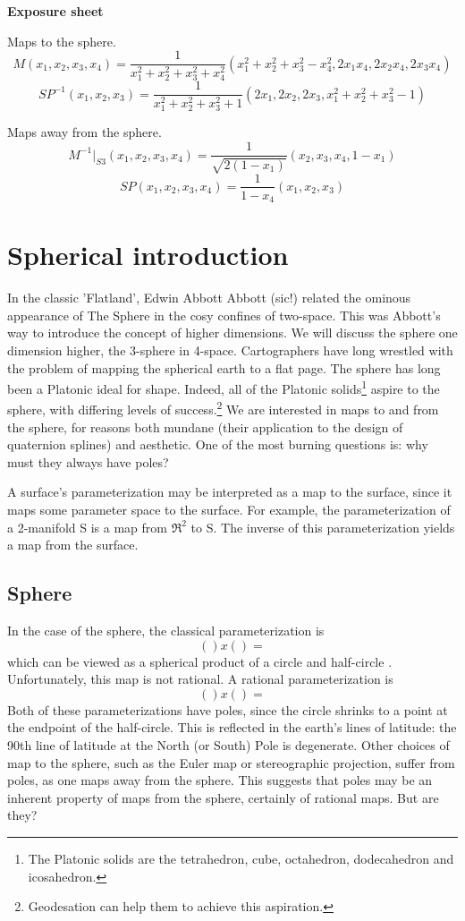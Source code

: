 \documentclass[12pt]{article}
\begin{document}
\clearpage

{\bf Exposure sheet}

Maps to the sphere.
\[
	M(x_1,x_2,x_3,x_4) =
	\frac{1}{x_1^2 + x_2^2 + x_3^2 + x_4^2}
	(x_1^2 + x_2^2 + x_3^2 - x_4^2, 2x_1x_4, 2x_2x_4, 2x_3x_4)
\]
\[
SP^{-1}(x_1,x_2,x_3) = \frac{1}{x_1^2 + x_2^2 + x_3^2 + 1} 
                       (2x_1, 2x_2, 2x_3, x_1^2+x_2^2+x_3^2 - 1)
\]

Maps away from the sphere.
\[
M^{-1}|_{S3}(x_1,x_2,x_3,x_4) = \frac{1}{\sqrt{2(1-x_1)}}(x_2,x_3,x_4,1-x_1)
\]
\[
SP(x_1,x_2,x_3,x_4) = \frac{1}{1-x_4} (x_1,x_2,x_3)
\]

\clearpage

\tableofcontents

\clearpage

\section{Spherical introduction}

In the classic 'Flatland',
Edwin Abbott Abbott (sic!) related the ominous appearance of The Sphere in the
cosy confines of two-space.
This was Abbott's way to introduce the concept of higher dimensions.
We will discuss the sphere one dimension higher, the 3-sphere in 4-space.
Cartographers have long wrestled with the problem of mapping the spherical earth
to a flat page.
The sphere has long been a Platonic ideal for shape.
Indeed, all of the Platonic solids\footnote{The Platonic solids are the tetrahedron,
  cube, octahedron, dodecahedron and icosahedron.}
aspire to the sphere, with differing levels of success.\footnote{Geodesation can
  help them to achieve this aspiration.}
We are interested in maps to and from the sphere, 
for reasons both mundane (their application to the design of quaternion splines)
and aesthetic.
One of the most burning questions is: why must they always have poles?

A surface's parameterization may be interpreted as a map to the surface,
since it maps some parameter space to the surface.
For example, the parameterization of a 2-manifold S is a map from $\Re^2$ to S.
The inverse of this parameterization yields a map from the surface.

\subsection{Sphere}

In the case of the sphere, the classical parameterization is
\[
   () x () = 
\]
which can be viewed as a spherical product of a circle and half-circle \cite{barr}.
Unfortunately, this map is not rational.
A rational parameterization is 
\[
   () x () = 
\]
Both of these parameterizations have poles, since the circle shrinks to a point
at the endpoint of the half-circle.
This is reflected in the earth's lines of latitude: the 90th line of latitude at the
North (or South) Pole is degenerate.
Other choices of map to the sphere, such as the Euler map or 
stereographic projection, suffer from poles, as one maps away from the sphere.
This suggests that poles may be an inherent property of maps from the sphere,
certainly of rational maps.
But are they?
\end{document}
